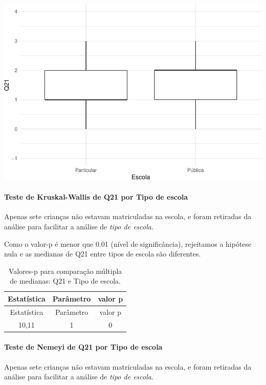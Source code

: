 \documentclass[]{article}
\let\oldparagraph\paragraph
\renewcommand{\paragraph}[1]{\oldparagraph{#1}\mbox{}}
\begin{document}
\begin{center}\includegraphics[width=0.75\linewidth]{relatorio_covid19_files/figure-latex/unnamed-chunk-471-1} \end{center}

\hypertarget{teste-de-kruskal-wallis-de-q21-por-tipo-de-escola}{%
\paragraph{Teste de Kruskal-Wallis de Q21 por Tipo de escola}\label{teste-de-kruskal-wallis-de-q21-por-tipo-de-escola}}

Apenas sete crianças não estavam matriculadas na escola, e foram retiradas da análise para facilitar a análise de \emph{tipo de escola}.

Como o valor-p é menor que 0.01 (nível de significância), rejeitamos a hipótese nula e as medianas de Q21 entre tipos de escola são diferentes.

\begin{longtable}[]{@{}ccc@{}}
\caption{\label{tab:unnamed-chunk-473}Valores-p para comparação múltipla de medianas: Q21 e Tipo de escola.}\tabularnewline
\toprule
Estatística & Parâmetro & valor p\tabularnewline
\midrule
\endfirsthead
\toprule
Estatística & Parâmetro & valor p\tabularnewline
\midrule
\endhead
10,11 & 1 & 0\tabularnewline
\bottomrule
\end{longtable}

\hypertarget{teste-de-nemeyi-de-q21-por-tipo-de-escola}{%
\paragraph{Teste de Nemeyi de Q21 por Tipo de escola}\label{teste-de-nemeyi-de-q21-por-tipo-de-escola}}

Apenas sete crianças não estavam matriculadas na escola, e foram retiradas da análise para facilitar a análise de \emph{tipo de escola}.
\end{document}
